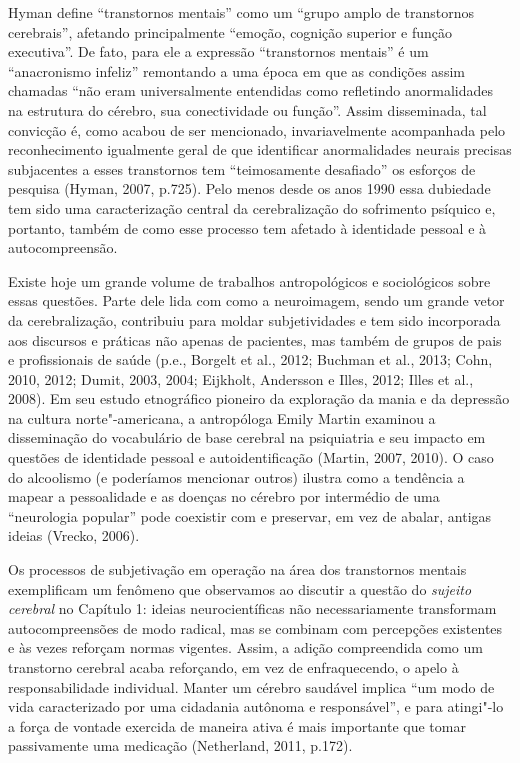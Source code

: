 Hyman define ``transtornos mentais'' como um ``grupo amplo de
transtornos cerebrais'', afetando principalmente ``emoção, cognição
superior e função executiva''. De fato, para ele a expressão
``transtornos mentais'' é um ``anacronismo infeliz'' remontando a uma
época em que as condições assim chamadas ``não eram universalmente
entendidas como refletindo anormalidades na estrutura do cérebro, sua
conectividade ou função''. Assim disseminada, tal convicção é, como
acabou de ser mencionado, invariavelmente acompanhada pelo
reconhecimento igualmente geral de que identificar anormalidades neurais
precisas subjacentes a esses transtornos tem ``teimosamente desafiado''
os esforços de pesquisa (Hyman, 2007, p.725). Pelo menos desde os anos
1990 essa dubiedade tem sido uma caracterização central da
cerebralização do sofrimento psíquico e, portanto, também de como esse
processo tem afetado à identidade pessoal e à autocompreensão.

Existe hoje um grande volume de trabalhos antropológicos e sociológicos
sobre essas questões. Parte dele lida com como a neuroimagem, sendo um
grande vetor da cerebralização, contribuiu para moldar subjetividades e
tem sido incorporada aos discursos e práticas não apenas de pacientes,
mas também de grupos de pais e profissionais de saúde (p.e., Borgelt et
al., 2012; Buchman et al., 2013; Cohn, 2010, 2012; Dumit, 2003, 2004;
Eijkholt, Andersson e Illes, 2012; Illes et al., 2008). Em seu estudo
etnográfico pioneiro da exploração da mania e da depressão na cultura
norte"-americana, a antropóloga Emily Martin examinou a disseminação do
vocabulário de base cerebral na psiquiatria e seu impacto em questões de
identidade pessoal e autoidentificação (Martin, 2007, 2010). O caso do
alcoolismo (e poderíamos mencionar outros) ilustra como a tendência a
mapear a pessoalidade e as doenças no cérebro por intermédio de uma
``neurologia popular'' pode coexistir com e preservar, em vez de abalar,
antigas ideias (Vrecko, 2006).

Os processos de subjetivação em operação na área dos transtornos mentais
exemplificam um fenômeno que observamos ao discutir a questão do
\emph{sujeito cerebral} no Capítulo 1: ideias neurocientíficas não
necessariamente transformam autocompreensões de modo radical, mas se
combinam com percepções existentes e às vezes reforçam normas vigentes.
Assim, a adição compreendida como um transtorno cerebral acaba
reforçando, em vez de enfraquecendo, o apelo à responsabilidade
individual. Manter um cérebro saudável implica ``um modo de vida
caracterizado por uma cidadania autônoma e responsável'', e para
atingi"-lo a força de vontade exercida de maneira ativa é mais importante
que tomar passivamente uma medicação (Netherland, 2011, p.172).

